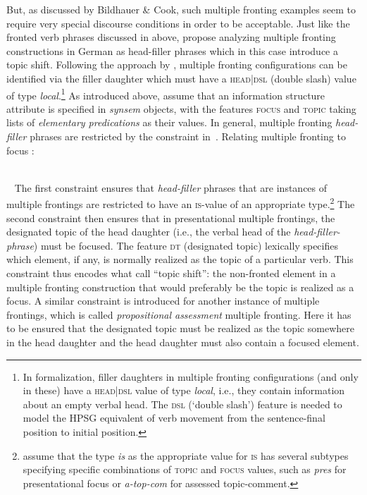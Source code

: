\documentclass[output=paper
	        ,collection
	        ,collectionchapter
 	        ,biblatex
                ,babelshorthands
                ,newtxmath
                ,draftmode
                ,colorlinks, citecolor=brown
]{langscibook}
\begin{document}
But, as discussed by Bildhauer \& Cook, such multiple fronting
examples seem to require very special discourse conditions in order to
be acceptable. Just like the fronted verb phrases discussed in
\cite{dKM2003a} above, \cite{BC2010a} propose
analyzing multiple fronting constructions in German as head-filler
phrases which in this case introduce a topic shift. Following the
approach by \cite{Mueller2005d}, multiple fronting
configurations can be identified via the filler daughter which must
have a \textsc{head|dsl} (double slash) value of type
\textit{local}.\footnote{In  formalization, filler daughters in multiple fronting configurations (and only in these) have a  \textsc{head|dsl} value of type \textit{local}, i.e., they contain information about an empty verbal head. The \textsc{dsl} (‘double slash’) feature is needed to model the HPSG equivalent of verb movement from the sentence-final position to initial position. } As introduced above, \cite{BC2010a} assume that an
information structure attribute is specified in \textit{synsem}
objects, with the features \textsc{focus} and \textsc{topic} taking
lists of \textit{elementary predications} as their values. In general,
multiple fronting \textit{head-filler} phrases are restricted by the
constraint in~.
\ea
Relating multiple fronting to focus \citep[75]{BC2010a}:\\
\impl\ 

\bigskip
\impl\ 
  \avmtmp{
    [ss|loc|cat|head|dt & <[loc|cont|rels \1]>\\
      hd-dtr|ss|is|focus & <\1>]
  }
  \label{fig:multiplefronting}
\z
The first constraint ensures that \textit{head-filler} phrases that
are instances of multiple frontings are restricted to have an
\textsc{is}-value of an appropriate type.\footnote{\cite[75]{BC2010a}
  assume that the type \textit{is} as the appropriate value for
  \textsc{is} has several subtypes specifying specific combinations of
  \textsc{topic} and \textsc{focus} values, such as \textit{pres} for
  presentational focus or \textit{a-top-com} for
  assessed topic-comment.} The second constraint then ensures that in
presentational multiple frontings, the designated topic of the head
daughter (i.e., the verbal head of the \textit{head-filler-phrase})
must be focused. The feature \textsc{dt} (designated topic) lexically specifies which
element, if any, is normally realized as the topic of a particular
verb. This constraint thus encodes what \cite{BC2010a} call ``topic
shift'': the non-fronted element in a multiple fronting construction
that would preferably be the topic is realized as a focus. A similar
constraint is introduced for another instance of multiple frontings,
which is called \textit{propositional assessment} multiple
fronting. Here it has to be ensured that the designated topic must be
realized as the topic somewhere in the head daughter and the
head daughter must also contain a focused element.
\end{document}
